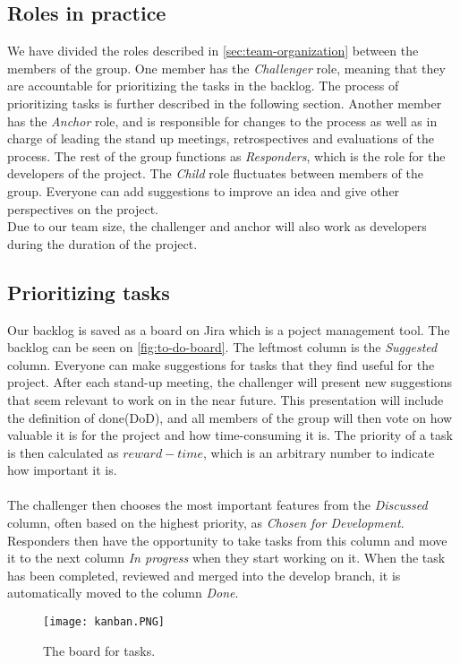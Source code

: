 \subsection{Roles in practice}
We have divided the roles described in \autoref{sec:team-organization} between the members of the group.
One member has the \textit{Challenger} role, meaning that they are accountable for prioritizing the tasks in the backlog.
The process of prioritizing tasks is further described in the following section.
Another member has the \textit{Anchor} role, and is responsible for changes to the process as well as in charge of leading the stand up meetings, retrospectives and evaluations of the process.
The rest of the group functions as \textit{Responders}, which is the role for the developers of the project.
The \textit{Child} role fluctuates between members of the group.
Everyone can add suggestions to improve an idea and give other perspectives on the project. \\
Due to our team size, the challenger and anchor will also work as developers during the duration of the project.

\subsection{Prioritizing tasks}
Our backlog is saved as a board on Jira which is a poject management tool.
The backlog can be seen on \autoref{fig:to-do-board}.
The leftmost column is the \textit{Suggested} column.
Everyone can make suggestions for tasks that they find useful for the project.
After each stand-up meeting, the challenger will present new suggestions that seem relevant to work on in the near future.
This presentation will include the definition of done(DoD), and all members of the group will then vote on how valuable it is for the project and how time-consuming it is.
The priority of a task is then calculated as $reward - time$, which is an arbitrary number to indicate how important it is.
\\\\
The challenger then chooses the most important features from the \textit{Discussed} column, often based on the highest priority, as \textit{Chosen for Development}.
Responders then have the opportunity to take tasks from this column and move it to the next column \textit{In progress} when they start working on it.
When the task has been completed, reviewed and merged into the develop branch, it is automatically moved to the column \textit{Done}.
\begin{figure}[H]
    \centering
    \texttt{[image: kanban.PNG]}
    \caption{The board for tasks.}
    \label{fig:to-do-board}
\end{figure}

